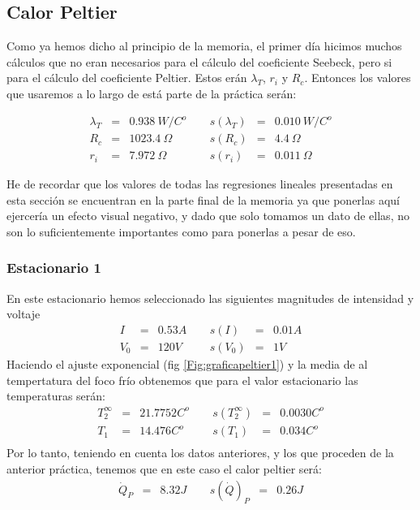 \documentclass[12pt,a4paper]{article}
\begin{document}
\subsection{Calor Peltier}

Como ya hemos dicho al principio de la memoria, el primer día hicimos muchos cálculos que no eran necesarios para el cálculo del coeficiente Seebeck, pero si para el cálculo del coeficiente Peltier. Estos erán $\lambda_T$, $r_i$ y $R_c$. Entonces los valores que usaremos a lo largo de está parte de la práctica serán:

\begin{equation}
\begin{array}{lllllll}
\lambda_T & = & 0.938  \ W/C^o & \ \ & s(\lambda_T) & = & 0.010  \ W/C^o \\
R_c & = & 1023.4 \ \Omega \ & \ \ & s(R_c) & = & 4.4 \ \Omega \\
r_i & = & 7.972 \ \Omega  & \ \ & s(r_i) & = & 0.011 \ \Omega
\end{array}
\end{equation}


He de recordar que los valores de todas las regresiones lineales presentadas en esta sección se encuentran en la parte final de la memoria ya que ponerlas aquí ejercería un efecto visual negativo, y dado que solo tomamos un dato de ellas, no son lo suficientemente importantes como para ponerlas a pesar de eso. 

\subsubsection{Estacionario 1}
En este estacionario hemos seleccionado las siguientes magnitudes de intensidad y voltaje  
\begin{equation} 
\begin{array}{lllllll}
I & = & 0.53 A & \ \ & s(I) & = & 0.01  A \\ 
 V_0 & = & 120 V & \ \ & s(V_0) & = & 1 V
\end{array} 
\end{equation} 
 Haciendo el ajuste exponencial (fig \ref{Fig:graficapeltier1}) y la media de al tempertatura del foco frío obtenemos que para el valor estacionario las temperaturas serán: 
\begin{equation} 
\begin{array}{lllllll}
T_2^{\infty} & = & 21.7752 C^o &  \ \ &  s(T_2^{\infty}) & =  & 0.0030  C^o \\ 
 T_1 & = & 14.476  C^o & \ \ & s(T_1) & = & 0.034  C^o \\ 
 \end{array} 
\end{equation} 
 Por lo tanto, teniendo en cuenta los datos anteriores, y los que proceden de la anterior práctica, tenemos que en este caso el calor peltier será: 
\begin{equation} 
\begin{array}{lllllll}
\dot{Q}_P & = & 8.32 J & \ \ & s(\dot{Q})_P & = & 0.26 J \\ 
\end{array} 
\end{equation} 
 
\end{document}
